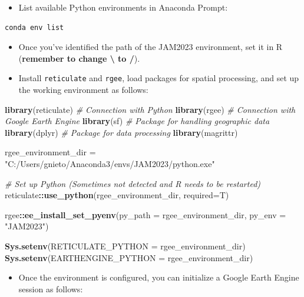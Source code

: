 \documentclass[
  12pt,
]{book}
\newenvironment{Shaded}{\begin{snugshade}}{\end{snugshade}}
\newcommand{\AttributeTok}[1]{\textcolor[rgb]{0.13,0.29,0.53}{#1}}
\newcommand{\CommentTok}[1]{\textcolor[rgb]{0.56,0.35,0.01}{\textit{#1}}}
\newcommand{\FunctionTok}[1]{\textcolor[rgb]{0.13,0.29,0.53}{\textbf{#1}}}
\newcommand{\NormalTok}[1]{#1}
\newcommand{\OtherTok}[1]{\textcolor[rgb]{0.56,0.35,0.01}{#1}}
\newcommand{\SpecialCharTok}[1]{\textcolor[rgb]{0.81,0.36,0.00}{\textbf{#1}}}
\newcommand{\StringTok}[1]{\textcolor[rgb]{0.31,0.60,0.02}{#1}}
\providecommand{\tightlist}{%
  \setlength{\itemsep}{0pt}\setlength{\parskip}{0pt}}
\begin{document}
\begin{itemize}
\tightlist
\item
  List available Python environments in Anaconda Prompt:
\end{itemize}

\begin{verbatim}
conda env list
\end{verbatim}

\begin{itemize}
\tightlist
\item
  Once you've identified the path of the JAM2023 environment, set it in R (\textbf{remember to change \textbackslash{} to /}).
\item
  Install \texttt{reticulate} and \texttt{rgee}, load packages for spatial processing, and set up the working environment as follows:
\end{itemize}

\begin{Shaded}
\begin{Highlighting}[]
\FunctionTok{library}\NormalTok{(reticulate) }\CommentTok{\# Connection with Python}
\FunctionTok{library}\NormalTok{(rgee) }\CommentTok{\# Connection with Google Earth Engine}
\FunctionTok{library}\NormalTok{(sf) }\CommentTok{\# Package for handling geographic data}
\FunctionTok{library}\NormalTok{(dplyr) }\CommentTok{\# Package for data processing}
\FunctionTok{library}\NormalTok{(magrittr)}

\NormalTok{rgee\_environment\_dir }\OtherTok{=} \StringTok{"C:/Users/gnieto/Anaconda3/envs/JAM2023/python.exe"}

\CommentTok{\# Set up Python (Sometimes not detected and R needs to be restarted)}
\NormalTok{reticulate}\SpecialCharTok{::}\FunctionTok{use\_python}\NormalTok{(rgee\_environment\_dir, }\AttributeTok{required=}\NormalTok{T)}

\NormalTok{rgee}\SpecialCharTok{::}\FunctionTok{ee\_install\_set\_pyenv}\NormalTok{(}\AttributeTok{py\_path =}\NormalTok{ rgee\_environment\_dir, }\AttributeTok{py\_env =} \StringTok{"JAM2023"}\NormalTok{)}

\FunctionTok{Sys.setenv}\NormalTok{(}\AttributeTok{RETICULATE\_PYTHON =}\NormalTok{ rgee\_environment\_dir)}
\FunctionTok{Sys.setenv}\NormalTok{(}\AttributeTok{EARTHENGINE\_PYTHON =}\NormalTok{ rgee\_environment\_dir)}
\end{Highlighting}
\end{Shaded}

\begin{itemize}
\tightlist
\item
  Once the environment is configured, you can initialize a Google Earth Engine session as follows:
\end{itemize}
\end{document}
